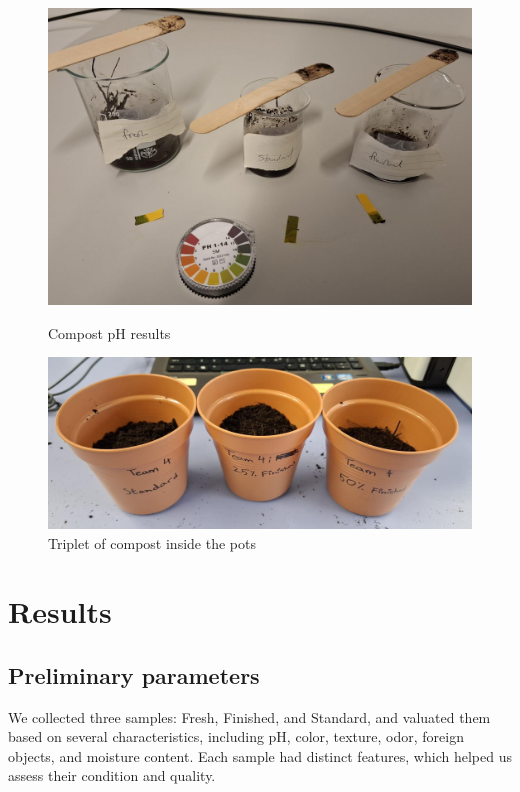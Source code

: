 \documentclass{article}
\begin{document}
\begin{figure}[ht!]
    \begin{minipage}[b]{0.5\textwidth}
        \centering
        \includegraphics[width=\textwidth]{media/ph-results.jpeg}
        \caption{Compost pH results}
    \end{minipage}
    \hfill
    \begin{minipage}[b]{0.5\textwidth}
        \centering
        \includegraphics[width=\textwidth]{media/pots.jpeg}
        \caption{Triplet of compost inside the pots}
    \end{minipage}
\end{figure}
\vspace*{.5cm}

\newpage
\section{Results}
\subsection{Preliminary parameters}
We collected three samples: Fresh, Finished, and Standard, and 
valuated them based on several characteristics, including pH, color,
texture, odor, foreign objects, and moisture content. Each sample had
distinct features, which helped us assess their condition and quality. 
\end{document}
